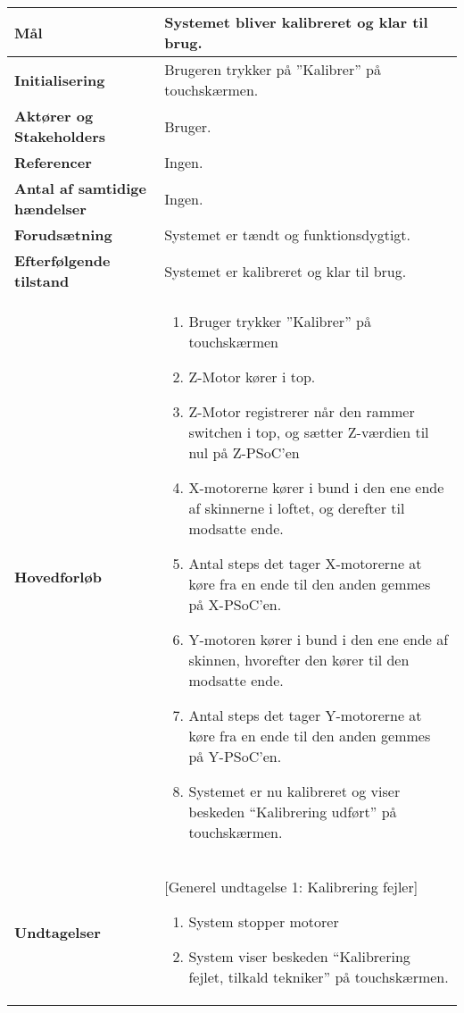 \begin{center}
\begin{longtable}{|p{6cm}|p{8cm}|}
        \textbf{Mål}								
            & Systemet bliver kalibreret og klar til brug.
        \\ \hline
        \textbf{Initialisering}					
            & Brugeren trykker på ”Kalibrer” på touchskærmen.
        \\ \hline
        \textbf{Aktører og Stakeholders}			
            & Bruger.
        \\ \hline
        \textbf{Referencer}						
            & Ingen.
        \\ \hline
        \textbf{Antal af samtidige hændelser}	
            & Ingen.
        \\ \hline
        \textbf{Forudsætning}					
            & Systemet er tændt og funktionsdygtigt.
        \\ \hline
        \textbf{Efterfølgende tilstand}			
            & Systemet er kalibreret og klar til brug.
        \\ \hline
        \textbf{Hovedforløb}						
            & 
            \begin{enumerate}
                \item Bruger trykker ”Kalibrer” på touchskærmen
                \item Z-Motor kører i top.
                \item Z-Motor registrerer når den rammer switchen i top, og sætter Z-værdien til nul på Z-PSoC'en
                \item X-motorerne kører i bund i den ene ende af skinnerne i loftet, og derefter til modsatte ende.
                \item Antal steps det tager X-motorerne at køre fra en ende til den anden gemmes på X-PSoC'en.
                \item Y-motoren kører i bund i den ene ende af skinnen, hvorefter den kører til den modsatte ende.
                \item Antal steps det tager Y-motorerne at køre fra en ende til den anden gemmes på Y-PSoC'en.
                \item Systemet er nu kalibreret og viser beskeden “Kalibrering udført” på touchskærmen.
            \end{enumerate}
        \\ \hline
        \textbf{Undtagelser}						
            & [Generel undtagelse 1: Kalibrering fejler]
            \begin{enumerate}
			    \item System stopper motorer
			    \item System viser beskeden “Kalibrering fejlet, tilkald tekniker” på touchskærmen.
		    \end{enumerate}
        \\ \hline
	\end{longtable}
	\label{UC1} 
\end{center}